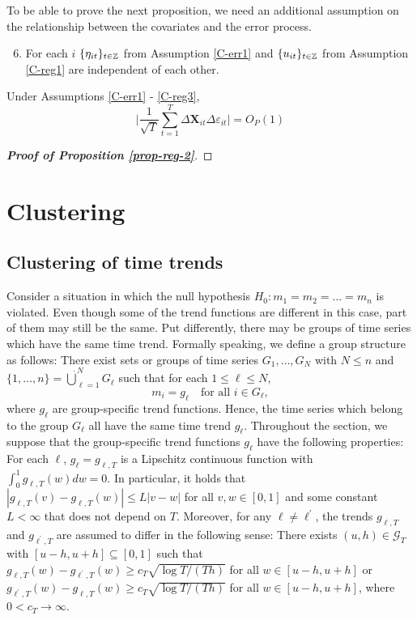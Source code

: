 To be able to prove the next proposition, we need an additional assumption on the relationship between the covariates and the error process.

\begin{enumerate}[label=(C\arabic*),leftmargin=1.05cm]
\setcounter{enumi}{5}
\item \label{C-reg4} For each $i$ $\{\eta_{it}\}_{t\in\mathbb{Z}}$ from Assumption \ref{C-err1} and $\{u_{it}\}_{t\in\mathbb{Z}}$ from Assumption \ref{C-reg1} are independent of each other.
\end{enumerate}


\begin{prop}\label{prop-reg-2}
Under Assumptions \ref{C-err1} - \ref{C-reg3},
\[ \big| \frac{1}{\sqrt{T}}\sum_{t=1}^T \Delta \mathbf{X}_{it}\Delta \varepsilon_{it} \big| = O_P(1)
\]
\end{prop}
\begin{proof}[\textnormal{\textbf{Proof of Proposition \ref{prop-reg-2}}}]
\end{proof}



\section{Clustering}
\subsection{Clustering of time trends}\label{subsec-test-equality-clustering}


Consider a situation in which the null hypothesis $H_0: m_1 = m_2 = \ldots = m_n$ is violated. Even though some of the trend functions are different in this case, part of them may still be the same. Put differently, there may be groups of time series which have the same time trend. Formally speaking, we define a group structure as follows: There exist sets or groups of time series $G_1,\ldots,G_N$ with $N \le n$ and $\{1,\ldots,n\} = \mathbin{\dot{\bigcup}}_{\ell=1}^{N} G_\ell$ such that for each $1 \le \ell \le N$,
\[ m_i = g_\ell \quad \text{for all } i \in G_\ell, \]
where $g_\ell$ are group-specific trend functions. Hence, the time series which belong to the group $G_\ell$ all have the same time trend $g_\ell$. Throughout the section, we suppose that the group-specific trend functions $g_\ell$ have the following properties: For each $\ell$, $g_\ell = g_{\ell,T}$ is a Lipschitz continuous function with $\int_0^1 g_{\ell,T}(w) dw = 0$. In particular, it holds that $|g_{\ell,T}(v) - g_{\ell,T}(w)| \le L |v-w|$ for all $v,w \in [0,1]$ and some constant $L < \infty$ that does not depend on $T$. Moreover, for any $\ell \ne \ell^\prime$, the trends $g_{\ell,T}$ and $g_{\ell^\prime,T}$ are assumed to differ in the following sense: There exists $(u,h) \in \mathcal{G}_T$ with $[u-h,u+h] \subseteq [0,1]$ such that $g_{\ell,T}(w) - g_{\ell^\prime,T}(w) \ge c_T \sqrt{\log T/(Th)}$ for all $w \in [u-h,u+h]$ or $g_{\ell^\prime,T}(w) - g_{\ell,T}(w) \ge c_T \sqrt{\log T/(Th)}$ for all $w \in [u-h,u+h]$, where $0 < c_T \rightarrow \infty$.


